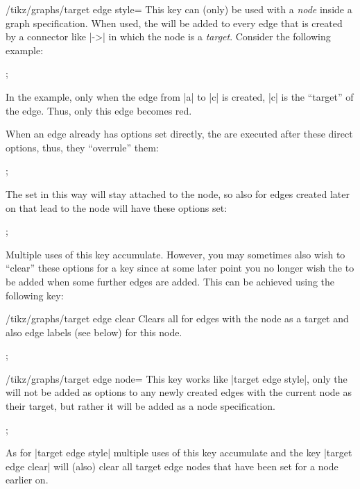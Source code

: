 \begin{key}{/tikz/graphs/target edge style=}
  This key can (only) be used with a \emph{node} inside a graph 
  specification. When used, the  will be added to every
  edge that is created by a connector like |->| in which the node is a
  \emph{target}. Consider the following example:
\begin{codeexample}[]
\tikz {};
\end{codeexample}
  In the example, only when the edge from |a| to |c| is created, |c|
  is the ``target'' of the edge. Thus, only this edge becomes red.
  
  When an edge already has options set directly, the 
  are executed after these direct options, thus, they ``overrule''
  them:
\begin{codeexample}[]
\tikz {};
\end{codeexample}
  
  The  set in this way will stay attached to the node,
  so also for edges created later on that lead to the node will have
  these options set:
\begin{codeexample}[]
\tikz {};
\end{codeexample}

  Multiple uses of this key accumulate. However, you may sometimes
  also wish to ``clear'' these options for a key since at some later
  point you no longer wish the  to be added when some
  further edges are added. This can be achieved using the following
  key:
  \begin{key}{/tikz/graphs/target edge clear}
    Clears all  for edges with the node as a target and
    also edge labels (see below) for this node.    
  \end{key}
\begin{codeexample}[]
\tikz {};
\end{codeexample}
\end{key}

\begin{key}{/tikz/graphs/target edge node=}
  This key works like |target edge style|, only the  will not be added as options to any newly created
  edges with the current node as their target, but rather it will be
  added as a node specification.  
\begin{codeexample}[]
\tikz {};
\end{codeexample}
  As for |target edge style| multiple uses of this key accumulate and
  the key |target edge clear| will (also) clear all target edge nodes
  that have been set for a node earlier on.
\end{key}

